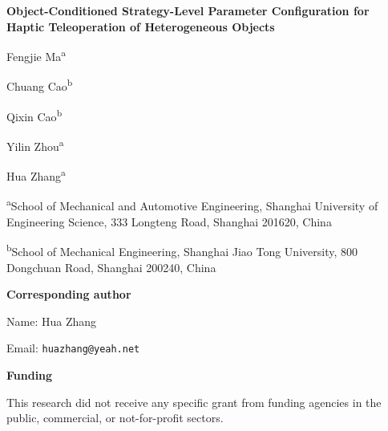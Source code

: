\documentclass[preprint,12pt]{elsarticle}
\begin{document}
\thispagestyle{empty}

\begin{center}
  {\LARGE\bfseries Object-Conditioned Strategy-Level Parameter Configuration for Haptic Teleoperation of Heterogeneous Objects\par}
  \vspace{2em}

  {\large Fengjie Ma\textsuperscript{a}\par}
  {\large Chuang Cao\textsuperscript{b}\par}
  {\large Qixin Cao\textsuperscript{b}\par}
  {\large Yilin Zhou\textsuperscript{a}\par}
  {\large Hua Zhang\textsuperscript{a}\par}
\end{center}

\vspace{1.5em}

{\small\noindent\textsuperscript{a}School of Mechanical and Automotive Engineering, Shanghai University of Engineering Science, 333 Longteng Road, Shanghai 201620, China\par}

\vspace{0.75em}

{\small\noindent\textsuperscript{b}School of Mechanical Engineering, Shanghai Jiao Tong University, 800 Dongchuan Road, Shanghai 200240, China\par}

\vspace{1.5em}

\noindent\textbf{Corresponding author}\par
\noindent Name: Hua Zhang\par
\noindent Email: \texttt{huazhang@yeah.net}\par

\vspace{1.5em}

\noindent\textbf{Funding}\par
\noindent This research did not receive any specific grant from funding agencies in the public, commercial, or not-for-profit sectors.
\end{document}
